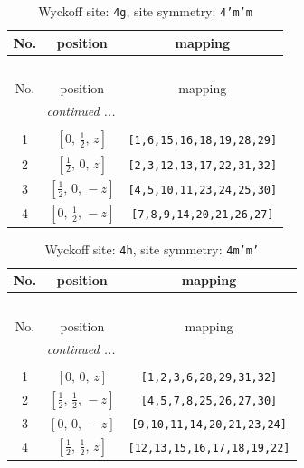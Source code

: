 \documentclass[fleqn,8pt]{jsarticle}
\begin{document}
\renewcommand{\arraystretch}{1.2}
\begin{longtable}{ccc}
\caption{Wyckoff site: {\tt 4g}, site symmetry: {\tt 4'm'm}}
 \\
 \hline \hline
No. & position & mapping \\ \hline \endfirsthead

\multicolumn{2}{l}{\tablename\ \thetable{}} \\
 \hline \hline
No. & position & mapping \\ \hline \endhead

 \hline \hline
\multicolumn{2}{r}{\footnotesize\it continued ...} \\ \endfoot

 \hline \hline
\multicolumn{2}{r}{} \\ \endlastfoot

1 & $\left[ 0,\, \frac{1}{2},\, z \right]$ & {\tt [1,6,15,16,18,19,28,29]} \\ \hline
2 & $\left[ \frac{1}{2},\, 0,\, z \right]$ & {\tt [2,3,12,13,17,22,31,32]} \\ \hline
3 & $\left[ \frac{1}{2},\, 0,\, - z \right]$ & {\tt [4,5,10,11,23,24,25,30]} \\ \hline
4 & $\left[ 0,\, \frac{1}{2},\, - z \right]$ & {\tt [7,8,9,14,20,21,26,27]} \\
\end{longtable}
\renewcommand{\arraystretch}{1.2}
\begin{longtable}{ccc}
\caption{Wyckoff site: {\tt 4h}, site symmetry: {\tt 4m'm'}}
 \\
 \hline \hline
No. & position & mapping \\ \hline \endfirsthead

\multicolumn{2}{l}{\tablename\ \thetable{}} \\
 \hline \hline
No. & position & mapping \\ \hline \endhead

 \hline \hline
\multicolumn{2}{r}{\footnotesize\it continued ...} \\ \endfoot

 \hline \hline
\multicolumn{2}{r}{} \\ \endlastfoot

1 & $\left[ 0,\, 0,\, z \right]$ & {\tt [1,2,3,6,28,29,31,32]} \\ \hline
2 & $\left[ \frac{1}{2},\, \frac{1}{2},\, - z \right]$ & {\tt [4,5,7,8,25,26,27,30]} \\ \hline
3 & $\left[ 0,\, 0,\, - z \right]$ & {\tt [9,10,11,14,20,21,23,24]} \\ \hline
4 & $\left[ \frac{1}{2},\, \frac{1}{2},\, z \right]$ & {\tt [12,13,15,16,17,18,19,22]} \\
\end{longtable}
\end{document}
